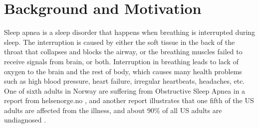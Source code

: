\section{Background and Motivation}
Sleep apnea is a sleep disorder that happens when breathing is interrupted during sleep. The interruption is caused by either the soft tissue in the back of the throat that collapses and blocks the airway, or the breathing muscles failed to receive signals from brain, or both. Interruption in breathing leads to lack of oxygen to the brain and the rest of body, which causes many health problems such as high blood pressure, heart failure, irregular heartbeats, headaches, etc. One of sixth adults in Norway are suffering from Obstructive Sleep Apnea in a report from helsenorge.no \citep{HELSENORGES}, and another report illustrates that one fifth of the US adults are affected from the illness, and about 90\% of all US adults are undiagnosed \citep{SLEEP_M_UNDIAG}.\\\\
